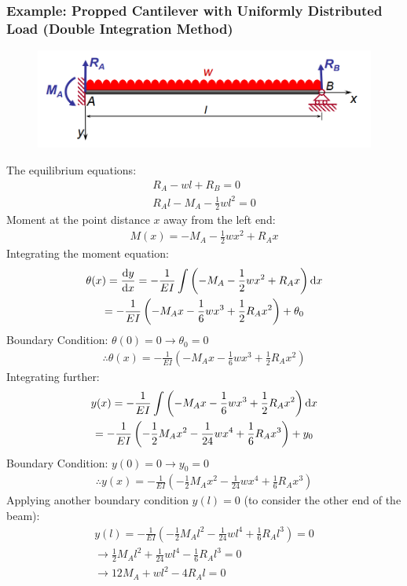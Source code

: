 \documentclass[class=report, crop=false, 12pt,a4paper]{standalone}
\begin{document}
\subsubsection{Example: Propped Cantilever with Uniformly Distributed Load (Double Integration Method)}
\begin{figure}[H]
  \centering
  \includegraphics[width = 0.9 \textwidth]{../img/beam12.PNG}
\end{figure}
The equilibrium equations:
\begin{gather}
  R_A-wl+R_B = 0 \\
  R_Al-M_A-\frac{1}{2}wl^2 = 0
\end{gather}
Moment at the point distance $x$ away from the left end:
\begin{gather}
  M(x) = -M_A-\frac{1}{2}wx^2+R_Ax
\end{gather}
Integrating the moment equation:
\begin{gather}
  \theta(x) = \frac{\dif y}{\dif x} = -\frac{1}{EI}\int\left(-M_A-\frac{1}{2}wx^2+R_Ax\right)\dif x \\
  = -\frac{1}{EI}\left(-M_Ax-\frac{1}{6}wx^3+\frac{1}{2}R_Ax^2\right) + \theta_0
\end{gather}
Boundary Condition: $\theta(0) = 0 \longrightarrow \theta_0 = 0$
\begin{gather}
  \therefore \theta(x) = -\frac{1}{EI}\left(-M_Ax-\frac{1}{6}wx^3+\frac{1}{2}R_Ax^2\right)
\end{gather}
Integrating further:
\begin{gather}
  y(x) = -\frac{1}{EI}\int\left(-M_Ax-\frac{1}{6}wx^3+\frac{1}{2}R_Ax^2\right)\dif x \\
  = -\frac{1}{EI}\left(-\frac{1}{2}M_Ax^2-\frac{1}{24}wx^4+\frac{1}{6}R_Ax^3\right) + y_0
\end{gather}
Boundary Condition: $y(0) = 0 \longrightarrow y_0 = 0$
\begin{gather}
  \therefore y(x) = -\frac{1}{EI}\left(-\frac{1}{2}M_Ax^2-\frac{1}{24}wx^4+\frac{1}{6}R_Ax^3\right)
\end{gather}
Applying another boundary condition $y(l) = 0$ (to consider the other end of the beam):
\begin{gather}
  y(l) = -\frac{1}{EI}\left(-\frac{1}{2}M_Al^2-\frac{1}{24}wl^4+\frac{1}{6}R_Al^3\right) = 0 \\
  \longrightarrow \frac{1}{2}M_Al^2+\frac{1}{24}wl^4-\frac{1}{6}R_Al^3 = 0 \\
  \longrightarrow 12M_A + wl^2 - 4R_Al = 0
  \label{doubleintegration}
\end{gather}
\end{document}
